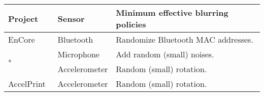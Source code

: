 \begin{table}
\scriptsize
\centering

\bgroup
\def\arraystretch{1.15}%
\begin{tabular}{|l|l|l|}
\hline
{\bf Project} & {\bf Sensor} & {\bf Minimum effective blurring policies}  \\\hline

\multirow{2}{*}{EnCore~\cite{aditya2014encore}}  & \multirow{2}{*}{Bluetooth} & 
\multirow{2}{3.5cm}{Randomize Bluetooth MAC addresses.}  \\
& &  \\\hline


\multirow{2}{*}{\cite{bojinov2014mobile}\textsuperscript{*}} & Microphone  
& Add random (small) noises. \\ \cline{2-3}
& Accelerometer & Random (small) rotation.  \\ \hline

AccelPrint~\cite{dey2014accelprint} & Accelerometer & Random (small) 
rotation.   \\ \hline


\end{tabular}
\end{table}

